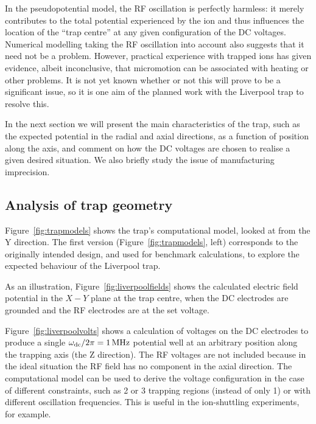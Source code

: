 In the pseudopotential model, the RF oscillation is perfectly harmless: it merely contributes to the total potential experienced by the ion and thus influences the location of the ``trap centre'' at any given configuration of the DC voltages. Numerical modelling taking the RF oscillation into account also suggests that it need not be a problem. However, practical experience with trapped ions has given evidence, albeit inconclusive, that micromotion can be associated with heating or other problems. It is not yet known whether or not this will prove to be a significant issue, so it is one aim of the planned work with the Liverpool trap to resolve this. 

In the next section we will present the main characteristics of the trap, such as the expected potential in the radial and axial directions, as a function of position along the axis, and comment on how the DC voltages are chosen to realise a given desired situation. We also briefly study the issue of manufacturing imprecision.

\subsection{Analysis of trap geometry}
\label{sec:liverpoolgeom}
Figure~\ref{fig:trapmodels} shows the trap's computational model, looked at from the Y direction. The first version (Figure~\ref{fig:trapmodels}, left) corresponds to the originally intended design, and used for benchmark calculations, to explore the expected behaviour of the Liverpool trap.

As an illustration, Figure~\ref{fig:liverpoolfields} shows the calculated electric field potential in the $X-Y$ plane at the trap centre, when the DC electrodes are grounded and the RF electrodes are at the set voltage. 

Figure~\ref{fig:liverpoolvolts} shows a calculation of voltages on the DC electrodes to produce a single $\omega_{\rm dc}/2\pi = 1\,\mbox{MHz}$ potential well at an arbitrary position along the trapping axis (the Z direction). The RF voltages are not included because in the ideal situation the RF field has no component in the axial direction. The computational model can be used to derive the voltage configuration in the case of different constraints, such as 2 or 3 trapping regions (instead of only 1) or with different oscillation frequencies. This is useful in the ion-shuttling experiments, for example.



